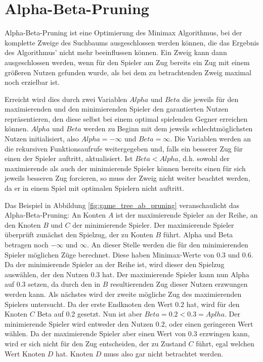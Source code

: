 \section{Alpha-Beta-Pruning}

Alpha-Beta-Pruning ist eine Optimierung des Minimax Algorithmus, bei der komplette Zweige des Suchbaums ausgeschlossen
werden können, die das Ergebnis des Algorithmus' nicht mehr beeinflussen können. Ein Zweig kann dann ausgeschlossen
werden, wenn für den Spieler am Zug bereits ein Zug mit einem größeren Nutzen gefunden wurde, als bei dem zu
betrachtenden Zweig maximal noch erzielbar ist.

Erreicht wird dies durch zwei Variablen $Alpha$ und $Beta$ die jeweils für den maximierenden und den minimierenden
Spieler den garantierten Nutzen repräsentieren, den diese selbst bei einem optimal spielenden Gegner erreichen können.
$Alpha$ und $Beta$ werden zu Beginn mit dem jeweils schlechtmöglichsten Nutzen initialisiert, also $Alpha = -\infty$ und $Beta = \infty$.
Die Variablen werden an die rekursiven Funktionsaufrufe weitergegeben und, falls ein besserer Zug für einen der Spieler auftritt, aktualisiert.
Ist $Beta < Alpha$, d.h. sowohl der maximierende als auch der minimierende
Spieler können bereits einen für sich jeweils besseren Zug forcieren, so muss der Zweig nicht weiter beachtet werden, da er in einem Spiel mit optimalen Spielern nicht auftritt.

Das Beispiel in Abbildung \ref{fig:game_tree_ab_pruning} veranschaulicht das Alpha-Beta-Pruning:
An Konten $A$ ist der maximierende Spieler an der Reihe, an den Knoten $B$ und $C$ der minimierende Spieler.
Der maximierende Spieler überprüft zunächst den Spielzug, der zu Konten $B$ führt.
Alpha und Beta betragen noch $-\infty$ und $\infty$.
An dieser Stelle werden die für den minimierenden Spieler möglichen Züge berechnet.
Diese haben Minimax-Werte von $0.3$ und $0.6$.
Da der minimierende Spieler an der Reihe ist, wird dieser den Spielzug auswählen, der den Nutzen $0.3$ hat.
Der maximierende Spieler kann nun Alpha auf 0.3 setzen, da durch den in $B$ resultierenden Zug dieser Nutzen erzwungen werden kann.
Als nächstes wird der zweite mögliche Zug des maximierenden Spielers untersucht.
Da der erste Endknoten den Wert $0.2$ hat, wird für den Knoten $C$ Beta auf 0.2 gesetzt.
Nun ist aber $Beta=0.2<0.3=Aplha$.
Der minimierende Spieler wird entweder den Nutzen $0.2$, oder einen geringeren Wert wählen.
Da der maximierende Spieler aber einen Wert von $0.3$ erzwingen kann, wird er sich nicht für den Zug entscheiden, der zu Zustand $C$ führt, egal welchen Wert Knoten $D$ hat.
Knoten $D$ muss also gar nicht betrachtet werden.

